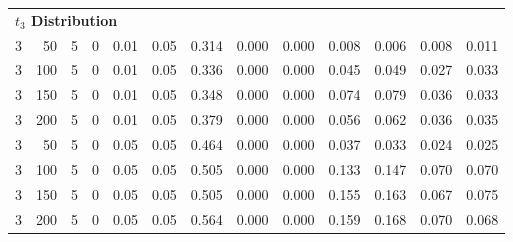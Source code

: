 \begin{table}
{{\begin{tabular}{rrrrrrlllllll}
\multicolumn{13}{l}{\textbf{$t_3$ Distribution}}\\
\hspace{1em}3 & 50 & 5 & 0 & 0.01 & 0.05 & 0.314 & 0.000 & 0.000 & 0.008 & 0.006 & 0.008 & 0.011\\
\hspace{1em}3 & 100 & 5 & 0 & 0.01 & 0.05 & 0.336 & 0.000 & 0.000 & 0.045 & 0.049 & 0.027 & 0.033\\
\hspace{1em}3 & 150 & 5 & 0 & 0.01 & 0.05 & 0.348 & 0.000 & 0.000 & 0.074 & 0.079 & 0.036 & 0.033\\
\hspace{1em}3 & 200 & 5 & 0 & 0.01 & 0.05 & 0.379 & 0.000 & 0.000 & 0.056 & 0.062 & 0.036 & 0.035\\
\hspace{1em}3 & 50 & 5 & 0 & 0.05 & 0.05 & 0.464 & 0.000 & 0.000 & 0.037 & 0.033 & 0.024 & 0.025\\
\hspace{1em}3 & 100 & 5 & 0 & 0.05 & 0.05 & 0.505 & 0.000 & 0.000 & 0.133 & 0.147 & 0.070 & 0.070\\
\hspace{1em}3 & 150 & 5 & 0 & 0.05 & 0.05 & 0.505 & 0.000 & 0.000 & 0.155 & 0.163 & 0.067 & 0.075\\
\hspace{1em}3 & 200 & 5 & 0 & 0.05 & 0.05 & 0.564 & 0.000 & 0.000 & 0.159 & 0.168 & 0.070 & 0.068\\
\bottomrule
\end{tabular}
}}
 \end{table}
